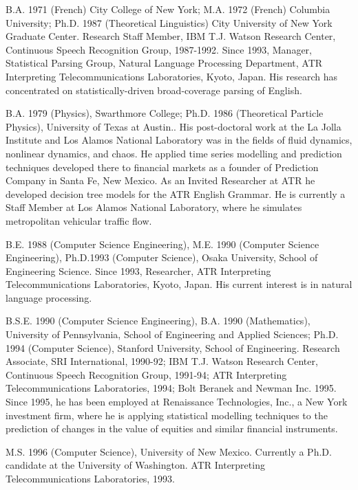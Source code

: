 \begin{biography}

\biotitle{}

{
B.A. 1971 (French) City College of New York; M.A. 1972
(French) Columbia University; Ph.D. 1987 (Theoretical Linguistics) 
City University of New York Graduate Center. Research Staff Member,
IBM T.J. Watson Research Center, Continuous Speech Recognition Group,
1987-1992. Since 1993, Manager, Statistical Parsing Group, Natural
Language Processing Department, ATR Interpreting Telecommunications
Laboratories, Kyoto, Japan. 
His research has concentrated on statistically-driven
broad-coverage parsing of English.
}

{
B.A. 1979 (Physics), Swarthmore College;
Ph.D. 1986 (Theoretical Particle Physics), University of Texas at
Austin.. His post-doctoral work at the La Jolla Institute and Los
Alamos National Laboratory was in the fields of fluid dynamics,
nonlinear dynamics, and chaos.  He applied time series modelling and
prediction techniques developed there to financial markets as a
founder of Prediction Company in Santa Fe, New Mexico. As an Invited
Researcher at ATR he developed decision tree models for the ATR
English Grammar. He is currently a Staff Member at Los Alamos National
Laboratory, where he simulates metropolitan vehicular traffic flow.
}

{
B.E. 1988 (Computer Science Engineering),
M.E. 1990 (Computer Science Engineering),
Ph.D.1993 (Computer Science),
Osaka University, School of Engineering Science.
Since 1993, Researcher, ATR Interpreting Telecommunications Laboratories,
Kyoto, Japan. His current interest is in natural language processing.
}

{
B.S.E. 1990 (Computer Science Engineering),
B.A. 1990 (Mathematics), University of Pennsylvania, School of
Engineering and Applied Sciences; Ph.D. 1994 (Computer Science),
Stanford University, School of Engineering. Research Associate, SRI
International, 1990-92; IBM T.J. Watson Research Center, Continuous
Speech Recognition Group, 1991-94; ATR Interpreting Telecommunications
Laboratories, 1994; Bolt Beranek and Newman Inc. 1995. Since 1995, he
has been employed at Renaissance Technologies, Inc., a New York
investment firm, where he is applying statistical modelling techniques
to the prediction of changes in the value of equities and similar
financial instruments.
}

{
M.S. 1996 (Computer Science), University of New Mexico.
Currently a Ph.D. candidate at the University of Washington.
ATR Interpreting Telecommunications Laboratories, 1993. 
}


\end{biography}
